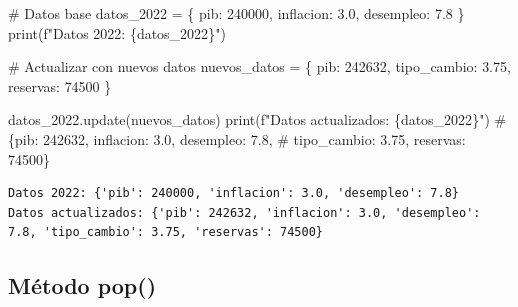 \documentclass[
  doc,
  floatsintext,
  longtable,
  a4paper,
  nolmodern,
  notxfonts,
  notimes,
  12pt,
  colorlinks=true,linkcolor=blue,citecolor=blue,urlcolor=blue]{apa7}
\newenvironment{Shaded}{\begin{snugshade}}{\end{snugshade}}
\newcommand{\BuiltInTok}[1]{\textcolor[rgb]{0.00,0.23,0.31}{#1}}
\newcommand{\CommentTok}[1]{\textcolor[rgb]{0.37,0.37,0.37}{#1}}
\newcommand{\DecValTok}[1]{\textcolor[rgb]{0.68,0.00,0.00}{#1}}
\newcommand{\FloatTok}[1]{\textcolor[rgb]{0.68,0.00,0.00}{#1}}
\newcommand{\NormalTok}[1]{\textcolor[rgb]{0.00,0.23,0.31}{#1}}
\newcommand{\OperatorTok}[1]{\textcolor[rgb]{0.37,0.37,0.37}{#1}}
\newcommand{\SpecialCharTok}[1]{\textcolor[rgb]{0.37,0.37,0.37}{#1}}
\newcommand{\SpecialStringTok}[1]{\textcolor[rgb]{0.13,0.47,0.30}{#1}}
\newcommand{\StringTok}[1]{\textcolor[rgb]{0.13,0.47,0.30}{#1}}
\begin{document}
\begin{Shaded}
\begin{Highlighting}[]
\CommentTok{\# Datos base}
\NormalTok{datos\_2022 }\OperatorTok{=}\NormalTok{ \{}
    \StringTok{\textquotesingle{}pib\textquotesingle{}}\NormalTok{: }\DecValTok{240000}\NormalTok{,}
    \StringTok{\textquotesingle{}inflacion\textquotesingle{}}\NormalTok{: }\FloatTok{3.0}\NormalTok{,}
    \StringTok{\textquotesingle{}desempleo\textquotesingle{}}\NormalTok{: }\FloatTok{7.8}
\NormalTok{\}}
\BuiltInTok{print}\NormalTok{(}\SpecialStringTok{f"Datos 2022: }\SpecialCharTok{\{}\NormalTok{datos\_2022}\SpecialCharTok{\}}\SpecialStringTok{"}\NormalTok{)}

\CommentTok{\# Actualizar con nuevos datos}
\NormalTok{nuevos\_datos }\OperatorTok{=}\NormalTok{ \{}
    \StringTok{\textquotesingle{}pib\textquotesingle{}}\NormalTok{: }\DecValTok{242632}\NormalTok{,}
    \StringTok{\textquotesingle{}tipo\_cambio\textquotesingle{}}\NormalTok{: }\FloatTok{3.75}\NormalTok{,}
    \StringTok{\textquotesingle{}reservas\textquotesingle{}}\NormalTok{: }\DecValTok{74500}
\NormalTok{\}}

\NormalTok{datos\_2022.update(nuevos\_datos)}
\BuiltInTok{print}\NormalTok{(}\SpecialStringTok{f"Datos actualizados: }\SpecialCharTok{\{}\NormalTok{datos\_2022}\SpecialCharTok{\}}\SpecialStringTok{"}\NormalTok{)}
\CommentTok{\# \{\textquotesingle{}pib\textquotesingle{}: 242632, \textquotesingle{}inflacion\textquotesingle{}: 3.0, \textquotesingle{}desempleo\textquotesingle{}: 7.8, }
\CommentTok{\#  \textquotesingle{}tipo\_cambio\textquotesingle{}: 3.75, \textquotesingle{}reservas\textquotesingle{}: 74500\}}
\end{Highlighting}
\end{Shaded}

\begin{verbatim}
Datos 2022: {'pib': 240000, 'inflacion': 3.0, 'desempleo': 7.8}
Datos actualizados: {'pib': 242632, 'inflacion': 3.0, 'desempleo': 7.8, 'tipo_cambio': 3.75, 'reservas': 74500}
\end{verbatim}

\subsection{Método pop()}\label{muxe9todo-pop-1}
\end{document}

